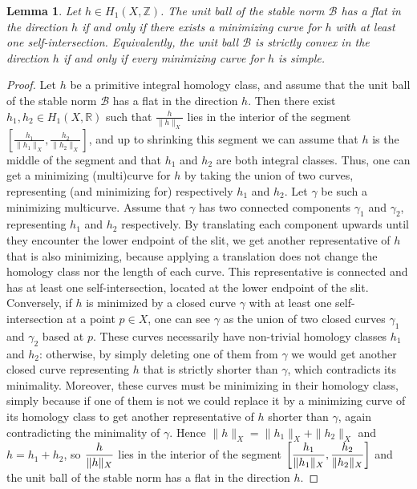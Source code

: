\documentclass{article}
\newcommand{\RR}{\mathbb{R}}
\newcommand{\ZZ}{\mathbb{Z}}
\newcommand{\Bb}{\mathcal{B}}
\newcommand{\St}[1]{\|#1\|_X}
\newtheorem{lemma}[thm]{Lemma}
\theoremstyle{definition}
\begin{document}
\begin{lemma}
	Let $h\in H_1(X,\ZZ)$. The unit ball of the stable norm $\Bb$ has a flat in the direction $h$ if and only if there exists a minimizing curve for $h$ with at least one self-intersection. Equivalently, the unit ball $\Bb$ is strictly convex in the direction $h$ if and only if every minimizing curve for $h$ is simple.
\end{lemma}


\begin{proof}
	Let $h$ be a primitive integral homology class, and assume that the unit ball of the stable norm $\Bb$ has a flat in the direction $h$. Then there exist $h_1,h_2 \in H_1(X,\RR)$ such that $\frac{h}{\St{h}}$ lies in the interior of the segment $[\frac{h_1}{\St{h_1}}, \frac{h_2}{\St{h_2}}]$, and up to shrinking this segment we can assume that $h$ is the middle of the segment and that $h_1$ and $h_2$ are both integral classes. Thus, one can get a minimizing (multi)curve for $h$ by taking the union of two curves, representing (and minimizing for) respectively $h_1$ and $h_2$. Let $\gamma$ be such a minimizing multicurve. Assume that $\gamma$ has two connected components $\gamma_1$ and $\gamma_2$, representing $h_1$ and $h_2$ respectively. By translating each component upwards until they encounter the lower endpoint of the slit, we get another representative of $h$ that is also minimizing, because applying a translation does not change the homology class nor the length of each curve. This representative is connected and has at least one self-intersection, located at the lower endpoint of the slit. \\ 
	
	Conversely, if $h$ is minimized by a closed curve $\gamma$ with at least one self-intersection at a point $p\in X$, one can see $\gamma$ as the union of two closed curves $\gamma_1$ and $\gamma_2$ based at $p$. These curves necessarily have non-trivial homology classes $h_1$ and $h_2$: otherwise, by simply deleting one of them from $\gamma$ we would get another closed curve representing $h$ that is strictly shorter than $\gamma$, which contradicts its minimality. Moreover, these curves must be minimizing in their homology class, simply because if one of them is not we could replace it by a minimizing curve of its homology class to get another representative of $h$ shorter than $\gamma$, again contradicting the minimality of $\gamma$. Hence $\St{h}=\St{h_1}+\St{h_2}$ and $h = h_1 + h_2$, so $\mathlarger{\frac{h}{\St{h}}}$ lies in the interior of the segment $\left [\mathlarger{\frac{h_1}{\St{h_1}}, \frac{h_2}{\St{h_2}}}\right ]$ and the unit ball of the stable norm has a flat in the direction $h$.
\end{proof}
\end{document}
